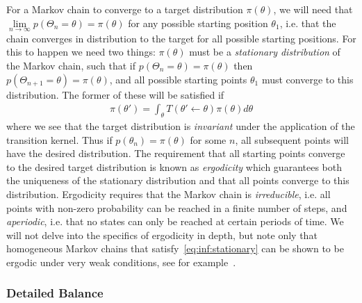  For a Markov chain to converge to a target distribution $\pi (\theta)$, we will need that
$\lim\limits_{n\rightarrow\infty} p(\Theta_n=\theta) = \pi(\theta)$ for any possible starting position $\theta_1$, i.e.
that the chain converges in distribution to the target for all possible starting positions.   For this
to happen we need two things: $\pi(\theta)$ must be a \emph{stationary distribution} of the Markov
chain, such that if $p(\Theta_n=\theta) = \pi(\theta)$ then $p(\Theta_{n+1}=\theta) = \pi(\theta)$, and all possible starting points
$\theta_1$ must converge to this distribution.  
The former of these will be satisfied if 
\begin{align}
\label{eq:inf:stationary}
\pi(\theta') = \int_{\theta} T(\theta' \leftarrow \theta) \pi(\theta)d\theta
\end{align}
where we see that the target distribution is \emph{invariant} under the application of the transition kernel.
Thus if $p(\theta_n)=\pi(\theta)$ for some $n$, all subsequent points will have the desired distribution.
The requirement that all starting points converge to the desired target distribution is known
as \emph{ergodicity} which guarantees both the uniqueness of the stationary distribution
and that all points converge to this distribution.  Ergodicity requires that the Markov chain is
\emph{irreducible}, i.e. all points with non-zero probability can be reached in a finite number
of steps, and \emph{aperiodic}, i.e. that no states can only be reached at certain periods of 
time.   We will not delve into the specifics of ergodicity in depth, but note only that homogeneous
Markov chains that satisfy~\eqref{eq:inf:stationary} can be shown to be ergodic under very weak
conditions, see for example~\cite{neal1993probabilistic,tierney1994markov}.

\subsubsection{Detailed Balance}
\label{sec:inf:foundation:mcmc:db}

